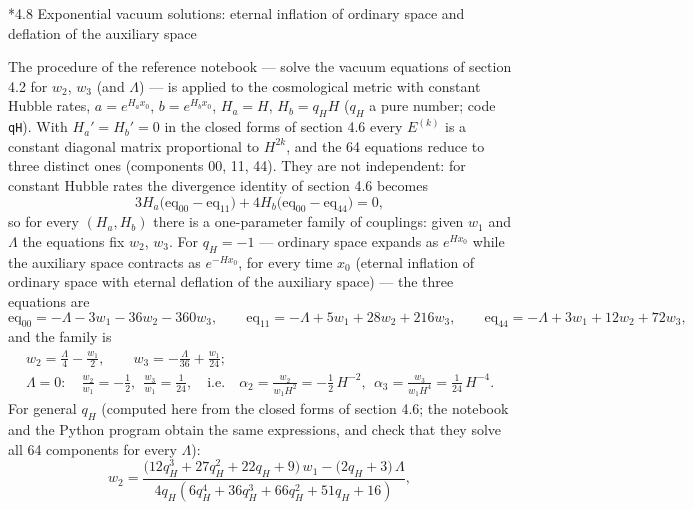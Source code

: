 \documentclass[10pt,a4paper]{article}
\makeatletter
\renewcommand\subsection{\@startsection{subsection}{2}{\z@}{-3.25ex\@plus -1ex \@minus -.2ex}{1.5ex \@plus .2ex}{\normalfont\large\bfseries\raggedright}}
\makeatother
\begin{document}
\subsection*{4.8 Exponential vacuum solutions: eternal inflation of ordinary space and deflation of the auxiliary space}
The procedure of the reference notebook — solve the vacuum equations of section 4.2 for $w_2$, $w_3$ (and $\Lambda$) — is applied to the cosmological metric with constant Hubble rates, $a=e^{H_a x_0}$, $b=e^{H_b x_0}$, $H_a=H$, $H_b=q_HH$ ($q_H$ a pure number; code \texttt{qH}). With $H_a'=H_b'=0$ in the closed forms of section 4.6 every $E^{(k)}$ is a constant diagonal matrix proportional to $H^{2k}$, and the 64 equations reduce to three distinct ones (components 00, 11, 44). They are not independent: for constant Hubble rates the divergence identity of section 4.6 becomes
\begin{equation*}
3H_a\big(\mathrm{eq}_{00}-\mathrm{eq}_{11}\big)+4H_b\big(\mathrm{eq}_{00}-\mathrm{eq}_{44}\big)=0,
\end{equation*}
so for every $(H_a,H_b)$ there is a one-parameter family of couplings: given $w_1$ and $\Lambda$ the equations fix $w_2$, $w_3$. For $q_H=-1$ — ordinary space expands as $e^{Hx_0}$ while the auxiliary space contracts as $e^{-Hx_0}$, for every time $x_0$ (eternal inflation of ordinary space with eternal deflation of the auxiliary space) — the three equations are
\begin{equation*}
\mathrm{eq}_{00}=- \Lambda - 3 w_{1} - 36 w_{2} - 360 w_{3},\qquad \mathrm{eq}_{11}=- \Lambda + 5 w_{1} + 28 w_{2} + 216 w_{3},\qquad \mathrm{eq}_{44}=- \Lambda + 3 w_{1} + 12 w_{2} + 72 w_{3},
\end{equation*}
and the family is
\begin{gather*}
w_2=\frac{\Lambda}{4} - \frac{w_{1}}{2},\qquad w_3=- \frac{\Lambda}{36} + \frac{w_{1}}{24};\\ \Lambda=0:\quad \frac{w_2}{w_1}=- \frac{1}{2},\ \ \frac{w_3}{w_1}=\frac{1}{24},\quad\text{i.e.}\quad \alpha_2=\frac{w_2}{w_1H^2}=- \frac{1}{2}\,H^{-2},\ \ \alpha_3=\frac{w_3}{w_1H^4}=\frac{1}{24}\,H^{-4}.
\end{gather*}
For general $q_H$ (computed here from the closed forms of section 4.6; the notebook and the Python program obtain the same expressions, and check that they solve all 64 components for every $\Lambda$):
\begin{equation*}
w_2=\frac{\big(12 q_{H}^{3} + 27 q_{H}^{2} + 22 q_{H} + 9\big)\,w_1-\big(2 q_{H} + 3\big)\,\Lambda}{4 q_{H} \left(6 q_{H}^{4} + 36 q_{H}^{3} + 66 q_{H}^{2} + 51 q_{H} + 16\right)},
\end{equation*}
\end{document}
